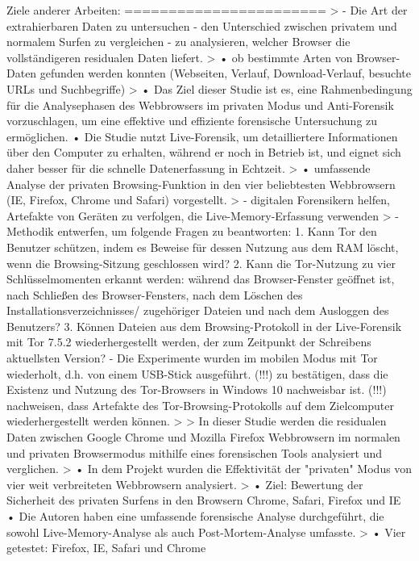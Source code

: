 Ziele anderer Arbeiten:
=======================
> \cite{Izzati.2022}
	-	Die Art der extrahierbaren Daten zu untersuchen
	-	den Unterschied zwischen privatem und normalem Surfen zu vergleichen 
	-	zu analysieren, welcher Browser die vollständigeren residualen Daten liefert.
> \cite{Montasari.2015}
	•	ob bestimmte Arten von Browser-Daten gefunden werden konnten (Webseiten, Verlauf, Download-Verlauf, besuchte URLs und Suchbegriffe)	
> \cite{Rochmadi.2017}
	•	Das Ziel dieser Studie ist es, eine Rahmenbedingung für die Analysephasen des Webbrowsers im privaten Modus und Anti-Forensik vorzuschlagen, um eine effektive und effiziente forensische Untersuchung zu ermöglichen.
	•	Die Studie nutzt Live-Forensik, um detailliertere Informationen über den Computer zu erhalten, während er noch in Betrieb ist, und eignet sich daher besser für die schnelle Datenerfassung in Echtzeit.
> \cite{Satvat.2014}
	•	umfassende Analyse der privaten Browsing-Funktion in den vier beliebtesten Webbrowsern (IE, Firefox, Chrome und Safari) vorgestellt.
> \cite{Izzati.2022}
	-	digitalen Forensikern helfen, Artefakte von Geräten zu verfolgen, die Live-Memory-Erfassung verwenden
> \cite{Muir.2019}
	-	Methodik entwerfen, um folgende Fragen zu beantworten:
	1.	Kann Tor den Benutzer schützen, indem es Beweise für dessen Nutzung aus dem RAM löscht, wenn die Browsing-Sitzung geschlossen wird?
	2.	Kann die Tor-Nutzung zu vier Schlüsselmomenten erkannt werden: während das Browser-Fenster geöffnet ist, nach Schließen des Browser-Fensters, nach dem Löschen des Installationsverzeichnisses/ zugehöriger Dateien und nach dem Ausloggen des Benutzers?
	3.	Können Dateien aus dem Browsing-Protokoll in der Live-Forensik mit Tor 7.5.2 wiederhergestellt werden, der zum Zeitpunkt der Schreibens aktuellsten Version?
	-	Die Experimente wurden im mobilen Modus mit Tor wiederholt, d.h. von einem USB-Stick ausgeführt.
	(!!!) zu bestätigen, dass die Existenz und Nutzung des Tor-Browsers in Windows 10 nachweisbar ist.
	(!!!) nachweisen, dass Artefakte des Tor-Browsing-Protokolls auf dem Zielcomputer wiederhergestellt werden können.
> \cite{Izzati.2022}
	> In dieser Studie werden die residualen Daten zwischen Google Chrome und Mozilla Firefox Webbrowsern im normalen und privaten Browsermodus mithilfe eines forensischen Tools analysiert und verglichen.
> \cite{Montasari.2015}
	•	In dem Projekt wurden die Effektivität der "privaten" Modus von vier weit verbreiteten Webbrowsern analysiert.
> \cite{Satvat.2014}
	•	Ziel: Bewertung der Sicherheit des privaten Surfens in den Browsern Chrome, Safari, Firefox und IE
	•	Die Autoren haben eine umfassende forensische Analyse durchgeführt, die sowohl Live-Memory-Analyse als auch Post-Mortem-Analyse umfasste.
> \cite{Montasari.2015}
	•	Vier getestet: Firefox, IE, Safari und Chrome
	

